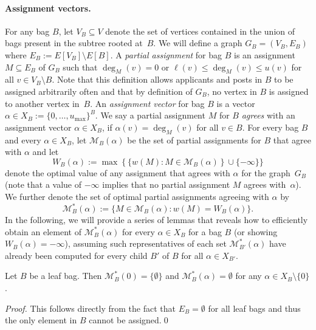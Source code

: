 \documentclass{llncs}
\begin{document}
\paragraph{Assignment vectors.}
For any bag $B$, let $V_B \subseteq V$ denote the set of vertices contained in the union of bags present in the subtree rooted at~$B$. We will define a graph $G_B = (V_B, E_B)$ where $E_B := E[V_B] \setminus E[B]$. A \emph{partial assignment} for bag $B$ is an assignment $M \subseteq E_B$ of $G_B$ such that $\deg_M(v) = 0$ or $\ell(v) \leq \deg_M(v) \leq u(v)$ for all $v \in V_B \setminus B$. Note that this definition allows applicants and posts in $B$ to be assigned arbitrarily often and that by definition of $G_B$, no vertex in $B$ is assigned to another vertex in~$B$. An \emph{assignment vector} for bag $B$ is a vector $\alpha \in X_B := \{0, \dots, u_{\max}\}^B$. We say a partial assignment $M$ for $B$ \emph{agrees} with an assignment vector $\alpha \in X_B$, if $\alpha(v) = \deg_M(v)$ for all $v \in B$.
For every bag $B$ and every $\alpha \in X_B$, let $\mathcal{M}_B(\alpha)$ be the set of partial assignments for $B$ that agree with $\alpha$ and let 
\[W_B(\alpha) := \max\left\{\{w(M) : M \in \mathcal{M}_B(\alpha)\right\} \cup \{-\infty\}\}\]
denote the optimal value of any assignment that agrees with $\alpha$ for the graph~$G_B$ (note that a value of $-\infty$ implies that no partial assignment $M$ agrees with~$\alpha$). We further denote the set of optimal partial assignments agreeing with $\alpha$ by
\[\mathcal{M}^*_B(\alpha) := \{M \in \mathcal{M}_B(\alpha) : w(M) = W_B(\alpha)\}.\]
In the following, we will provide a series of lemmas that reveals how to efficiently obtain an element of $\mathcal{M}^*_B(\alpha)$ for every $\alpha \in X_B$ for a bag $B$  (or showing $W_B(\alpha) = -\infty$), assuming such representatives of each set $\mathcal{M}^*_{B'}(\alpha)$ have already been computed for every child $B'$ of $B$ for all $\alpha \in X_{B'}$.

\begin{lemma}\label{lem:leaf}
	Let $B$ be a leaf bag. Then $\mathcal{M}^*_B(0) = \{\emptyset\}$ and $\mathcal{M}^*_B(\alpha) = \emptyset$ for any $\alpha \in X_B \setminus \{0\}$.
\end{lemma}
\begin{proof}
This follows directly from the fact that $E_B = \emptyset$ for all leaf bags and thus the only element in $B$ cannot be assigned.\qed
\end{proof}
\end{document}

